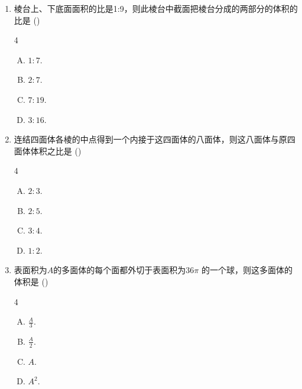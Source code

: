 \begin{enumerate}
\item 棱台上、下底面面积的比是1:9，则此棱台中截面把棱台分成的两部分的体积的比是 \hfill (\qquad )
\begin{multicols}{4}
\begin{enumerate}[(A)]
\item $1:7$.
\item $2:7$.
\item $7:19$.
\item $3:16$.
\end{enumerate}
\end{multicols}

\item 连结四面体各棱的中点得到一个内接于这四面体的八面体，则这八面体与原四面体体积之比是 \hfill (\qquad )
\begin{multicols}{4}
\begin{enumerate}[(A)]
\item $2:3$.
\item $2:5$.
\item $3:4$.
\item $1:2$.
\end{enumerate}
\end{multicols}


\item 表面积为$A$的多面体的每个面都外切于表面积为$36\pi$ 的一个球，则这多面体的体积是 \hfill (\qquad )
\begin{multicols}{4}
\begin{enumerate}[(A)]
\item $\frac{A}{3}$.
\item $\frac{A}{2}$.
\item $A$.
\item $A^2$.
\end{enumerate}
\end{multicols}
\end{enumerate}

